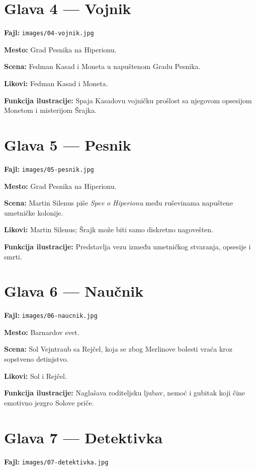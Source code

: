 \section*{Glava 4 — Vojnik}

\textbf{Fajl:} \texttt{images/04-vojnik.jpg}

\textbf{Mesto:} Grad Pesnika na Hiperionu.

\textbf{Scena:} Fedman Kasad i Moneta u napuštenom Gradu Pesnika.

\textbf{Likovi:} Fedman Kasad i Moneta.

\textbf{Funkcija ilustracije:} Spaja Kasadovu vojničku prošlost sa njegovom opsesijom Monetom i misterijom Šrajka.

\section*{Glava 5 — Pesnik}

\textbf{Fajl:} \texttt{images/05-pesnik.jpg}

\textbf{Mesto:} Grad Pesnika na Hiperionu.

\textbf{Scena:} Martin Silenus piše \emph{Spev o Hiperionu} među ruševinama napuštene umetničke kolonije.

\textbf{Likovi:} Martin Silenus; Šrajk može biti samo diskretno nagovešten.

\textbf{Funkcija ilustracije:} Predstavlja vezu između umetničkog stvaranja, opsesije i smrti.

\section*{Glava 6 — Naučnik}

\textbf{Fajl:} \texttt{images/06-naucnik.jpg}

\textbf{Mesto:} Barnardov svet.

\textbf{Scena:} Sol Vejntraub sa Rejčel, koja se zbog Merlinove bolesti vraća kroz sopstveno detinjstvo.

\textbf{Likovi:} Sol i Rejčel.

\textbf{Funkcija ilustracije:} Naglašava roditeljsku ljubav, nemoć i gubitak koji čine emotivno jezgro Solove priče.

\section*{Glava 7 — Detektivka}

\textbf{Fajl:} \texttt{images/07-detektivka.jpg}

